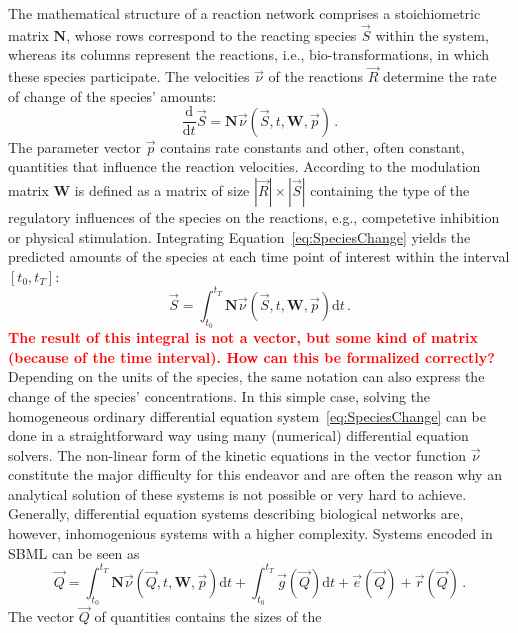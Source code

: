 \documentclass[10pt]{bmc_article}
\newenvironment{bmcformat}{\baselineskip20pt\sloppy\setboolean{publ}{false}}{\baselineskip20pt\sloppy}
\newcommand{\TODO}[1]{\textcolor{red}{\textbf{#1}}}
\newcommand{\D}{\mathrm{d}}
\begin{document}
\begin{bmcformat}
The mathematical structure of a reaction network comprises a stoichiometric
matrix $\mathbf{N}$, whose rows correspond to the reacting species $\vec{S}$
within the system, whereas its columns represent the reactions, i.e., bio-transformations,
in which these species participate.
The velocities $\vec{\nu}$ of the reactions $\vec{R}$ determine the rate of
change of the species' amounts:
\begin{equation}
\frac{\D}{\D t}\vec{S} = \mathbf{N}\vec{\nu}(\vec{S}, t, \mathbf{W}, \vec{p})\,.
\label{eq:SpeciesChange}
\end{equation}
The parameter vector $\vec{p}$ contains rate constants and other, often
constant, quantities that influence the reaction velocities.
According to \cite{Liebermeister2006, Liebermeister2010} the modulation matrix
$\mathbf{W}$ is defined as a matrix of size $|\vec{R}|\times|\vec{S}|$
containing the type of the regulatory influences of the species on
the reactions, e.g., competetive inhibition or physical stimulation.
Integrating Equation~\ref{eq:SpeciesChange} yields the predicted amounts of the
species at each time point of interest within the interval $[t_0, t_T]$:
\begin{equation}
\vec{S} = \int_{t_0}^{t_T} \mathbf{N}\vec{\nu}(\vec{S}, t, \mathbf{W}, \vec{p})
\D t\,.
\end{equation}
\TODO{The result of this integral is not a vector, but some kind of matrix
(because of the time interval). How can this be formalized correctly?}
Depending on the units of the species, the same notation can also express the
change of the species' concentrations.
In this simple case, solving the homogeneous ordinary
differential equation system~\ref{eq:SpeciesChange} can be done in a
straightforward way using many (numerical) differential equation solvers.
The non-linear form of the kinetic equations in the vector function $\vec{\nu}$
constitute the major difficulty for this endeavor and are often the reason why
an analytical solution of these systems is not possible or very hard to achieve.
Generally, differential equation systems describing biological networks are,
however, inhomogenious systems with a higher complexity.
Systems encoded in SBML can be seen as
\begin{equation}
\vec{Q} = \int_{t_0}^{t_T} \mathbf{N}\vec{\nu}(\vec{Q}, t, \mathbf{W},
\vec{p})\D t + \int_{t_0}^{t_T} \vec{g}(\vec{Q})\D t + \vec{e}(\vec{Q}) + \vec{r}(\vec{Q})\,.
\label{eq:QuantityValue}
\end{equation}
The vector $\vec{Q}$ of quantities contains the sizes of the

\end{bmcformat}
\end{document}
